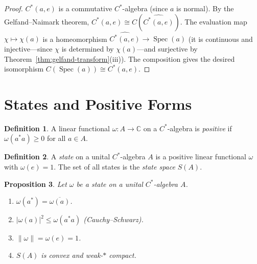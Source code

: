 \documentclass[a4paper,12pt]{book}
\DeclareMathOperator{\Spec}{Spec}
\newcommand{\C}{\mathbb{C}}
\newcommand{\norm}[1]{\left\| #1 \right\|}
\newcommand{\abs}[1]{\left| #1 \right|}
\theoremstyle{definition}
\newtheorem{definition}{Definition}[chapter]
\theoremstyle{plain}
\newtheorem{proposition}[definition]{Proposition}
\theoremstyle{remark}
\begin{document}
\begin{proof}
$C^*(a, e)$ is a commutative $C^*$-algebra (since $a$ is normal). By the
Gelfand--Naimark theorem, $C^*(a, e) \cong C(\widehat{C^*(a,e)})$.
The evaluation map $\chi \mapsto \chi(a)$ is a homeomorphism
$\widehat{C^*(a,e)} \to \Spec(a)$ (it is continuous and injective---since
$\chi$ is determined by $\chi(a)$---and surjective by
Theorem~\ref{thm:gelfand-transform}(iii)). The composition gives the desired
isomorphism $C(\Spec(a)) \cong C^*(a, e)$.
\end{proof}


\section{States and Positive Forms}\label{sec:states}


\begin{definition}\label{def:positive-form}
A linear functional $\omega \colon A \to \C$ on a $C^*$-algebra is
\emph{positive} if $\omega(a^*a) \ge 0$ for all $a \in A$.
\end{definition}

\begin{definition}\label{def:state}
A \emph{state} on a unital $C^*$-algebra $A$ is a positive linear functional
$\omega$ with $\omega(e) = 1$. The set of all states is the \emph{state
space} $S(A)$.
\end{definition}

\begin{proposition}\label{prop:state-properties}
Let $\omega$ be a state on a unital $C^*$-algebra $A$.
\begin{enumerate}[label=(\roman*)]
  \item $\omega(a^*) = \overline{\omega(a)}$.
  \item $\abs{\omega(a)}^2 \le \omega(a^*a)$ (Cauchy--Schwarz).
  \item $\norm{\omega} = \omega(e) = 1$.
  \item $S(A)$ is convex and weak-$*$ compact.
\end{enumerate}
\end{proposition}
\end{document}
